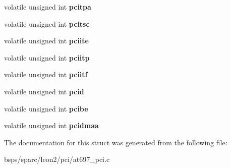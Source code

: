 \begin{DoxyCompactItemize}
volatile unsigned int {\bfseries pcitpa}
\item 
\mbox{\label{structat697pci__regs_ac7be6580a32407b2b5d4fb2da0d8a459}} 
volatile unsigned int {\bfseries pcitsc}
\item 
\mbox{\label{structat697pci__regs_a1281361edaa98855afad4c8b28c79eb9}} 
volatile unsigned int {\bfseries pciite}
\item 
\mbox{\label{structat697pci__regs_a0cff8bdf3e89be982c1f38ef4a7c9ea7}} 
volatile unsigned int {\bfseries pciitp}
\item 
\mbox{\label{structat697pci__regs_ac7bc024b1af8e6d89335aaff6c493fb9}} 
volatile unsigned int {\bfseries pciitf}
\item 
\mbox{\label{structat697pci__regs_ae234ede74a4c7d1a1e07a2f8d9856908}} 
volatile unsigned int {\bfseries pcid}
\item 
\mbox{\label{structat697pci__regs_a143fcaf19fd24b2e935b1ecc22acdb1f}} 
volatile unsigned int {\bfseries pcibe}
\item 
\mbox{\label{structat697pci__regs_aa90a60bb1e55efc0cbff7b6db0dd648b}} 
volatile unsigned int {\bfseries pcidmaa}
\end{DoxyCompactItemize}


The documentation for this struct was generated from the following file\+:\begin{DoxyCompactItemize}
\item 
bsps/sparc/leon2/pci/at697\+\_\+pci.\+c\end{DoxyCompactItemize}
